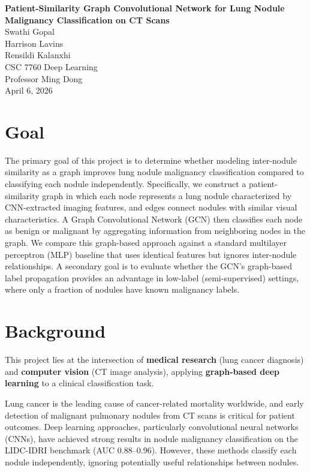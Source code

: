 \documentclass[12pt]{article}
\begin{document}
\begin{center}
    {\Large \textbf{Patient-Similarity Graph Convolutional Network for Lung Nodule Malignancy Classification on CT Scans}}\\[1.5em]

    Swathi Gopal\\
    Harrison Lavins\\
    Rensildi Kalanxhi\\[1em]

    CSC 7760 Deep Learning\\
    Professor Ming Dong\\
    April 6, 2026
\end{center}

\section*{Goal}

The primary goal of this project is to determine whether modeling inter-nodule similarity as a graph improves lung nodule malignancy classification compared to classifying each nodule independently. Specifically, we construct a patient-similarity graph in which each node represents a lung nodule characterized by CNN-extracted imaging features, and edges connect nodules with similar visual characteristics. A Graph Convolutional Network (GCN) then classifies each node as benign or malignant by aggregating information from neighboring nodes in the graph. We compare this graph-based approach against a standard multilayer perceptron (MLP) baseline that uses identical features but ignores inter-nodule relationships. A secondary goal is to evaluate whether the GCN's graph-based label propagation provides an advantage in low-label (semi-supervised) settings, where only a fraction of nodules have known malignancy labels.

\section*{Background}

This project lies at the intersection of \textbf{medical research} (lung cancer diagnosis) and \textbf{computer vision} (CT image analysis), applying \textbf{graph-based deep learning} to a clinical classification task.

Lung cancer is the leading cause of cancer-related mortality worldwide, and early detection of malignant pulmonary nodules from CT scans is critical for patient outcomes. Deep learning approaches, particularly convolutional neural networks (CNNs), have achieved strong results in nodule malignancy classification on the LIDC-IDRI benchmark (AUC 0.88--0.96). However, these methods classify each nodule independently, ignoring potentially useful relationships between nodules.
\end{document}
